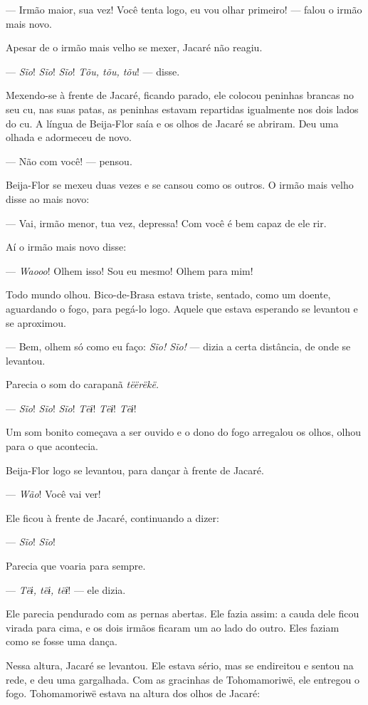 --- Irmão maior, sua vez! Você tenta logo, eu vou olhar primeiro! ---
falou o irmão mais novo. 

Apesar de o irmão mais velho se mexer, Jacaré não reagiu.

--- \textit{Sĩo}! \textit{Sĩo}! \textit{Sĩo}! \textit{Tõu, tõu, tõu}! --- disse.

Mexendo-se à frente de Jacaré, ficando parado, ele colocou peninhas
brancas no seu cu, nas suas patas, as peninhas estavam repartidas
igualmente nos dois lados do cu. A língua de Beija-Flor saía e os
olhos de Jacaré se abriram. Deu uma olhada e adormeceu de novo. 

--- Não com você! --- pensou. 

Beija-Flor se mexeu duas vezes e se cansou como os outros.
O irmão mais velho disse ao mais novo: 

--- Vai, irmão menor, tua vez, depressa! Com você é bem capaz de ele
rir.

Aí o irmão mais novo disse:

--- \textit{Waooo}! Olhem isso! Sou eu mesmo! Olhem para mim! 

Todo mundo olhou. Bico-de-Brasa estava triste, sentado, como um
doente, aguardando o fogo, para pegá-lo logo. Aquele que estava esperando
se levantou e se aproximou. 

--- Bem, olhem só como eu faço: \textit{Sĩo! Sĩo!} --- dizia a certa
distância, de onde se levantou. 

Parecia o som do carapanã \textit{tëërëkë.}

--- \textit{Sĩo}! \textit{Sĩo}! \textit{Sĩo}! \textit{Tëɨ}! \textit{Tëɨ}! \textit{Tëɨ}!

Um som bonito começava a ser ouvido e o dono do fogo arregalou os olhos,
olhou para o que acontecia.

Beija-Flor logo se levantou, para dançar à frente de Jacaré.

--- \textit{Wão}! Você vai ver!

Ele ficou à frente de Jacaré, continuando a dizer:

--- \textit{Sĩo}! \textit{Sĩo}!

Parecia que voaria para sempre. 

--- \textit{Tëɨ, tëɨ, tëɨ}! --- ele dizia. 

Ele parecia pendurado com as pernas abertas. Ele fazia assim: a cauda
dele ficou virada para cima, e os dois irmãos ficaram um ao lado do
outro. Eles faziam como se fosse uma dança. 


Nessa altura, Jacaré se levantou. Ele estava sério, mas se endireitou e
sentou na rede, e deu uma gargalhada. Com as gracinhas de Tohomamoriwë,
ele entregou o fogo. Tohomamoriwë estava na altura dos olhos de Jacaré: 

